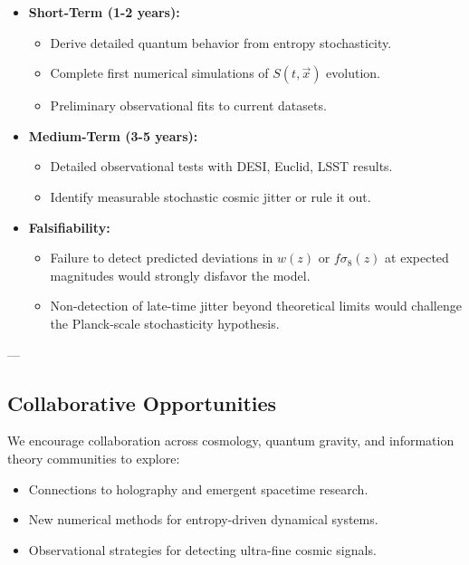 \documentclass{article}
\begin{document}
\begin{itemize}
    \item \textbf{Short-Term (1-2 years):}
    \begin{itemize}
        \item Derive detailed quantum behavior from entropy stochasticity.
        \item Complete first numerical simulations of $S(t, \vec{x})$ evolution.
        \item Preliminary observational fits to current datasets.
    \end{itemize}

    \item \textbf{Medium-Term (3-5 years):}
    \begin{itemize}
        \item Detailed observational tests with DESI, Euclid, LSST results.
        \item Identify measurable stochastic cosmic jitter or rule it out.
    \end{itemize}

    \item \textbf{Falsifiability:}
    \begin{itemize}
        \item Failure to detect predicted deviations in $w(z)$ or $f\sigma_8(z)$ at expected magnitudes would strongly disfavor the model.
        \item Non-detection of late-time jitter beyond theoretical limits would challenge the Planck-scale stochasticity hypothesis.
    \end{itemize}
\end{itemize}

---

\subsection{Collaborative Opportunities}

We encourage collaboration across cosmology, quantum gravity, and information theory communities to explore:

\begin{itemize}
    \item Connections to holography and emergent spacetime research.
    \item New numerical methods for entropy-driven dynamical systems.
    \item Observational strategies for detecting ultra-fine cosmic signals.
\end{itemize}
\end{document}

